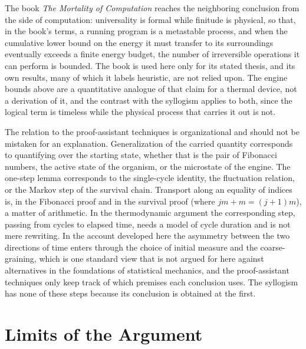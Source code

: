 \documentclass[11pt]{article}
\theoremstyle{definition}
\theoremstyle{remark}
\begin{document}
The book \emph{The Mortality of Computation} \cite{flyxion2026} reaches the neighboring conclusion from the side of computation: universality is formal while finitude is physical, so that, in the book's terms, a running program is a metastable process, and when the cumulative lower bound on the energy it must transfer to its surroundings eventually exceeds a finite energy budget, the number of irreversible operations it can perform is bounded. The book is used here only for its stated thesis, and its own results, many of which it labels heuristic, are not relied upon. The engine bounds above are a quantitative analogue of that claim for a thermal device, not a derivation of it, and the contrast with the syllogism applies to both, since the logical term is timeless while the physical process that carries it out is not.

The relation to the proof-assistant techniques is organizational and should not be mistaken for an explanation. Generalization of the carried quantity corresponds to quantifying over the starting state, whether that is the pair of Fibonacci numbers, the active state of the organism, or the microstate of the engine. The one-step lemma corresponds to the single-cycle identity, the fluctuation relation, or the Markov step of the survival chain. Transport along an equality of indices is, in the Fibonacci proof and in the survival proof (where $jm + m = (j+1)m$), a matter of arithmetic. In the thermodynamic argument the corresponding step, passing from cycles to elapsed time, needs a model of cycle duration and is not mere rewriting. In the account developed here the asymmetry between the two directions of time enters through the choice of initial measure and the coarse-graining, which is one standard view that is not argued for here against alternatives in the foundations of statistical mechanics, and the proof-assistant techniques only keep track of which premises each conclusion uses. The syllogism has none of these steps because its conclusion is obtained at the first.

\section{Limits of the Argument}
\end{document}
